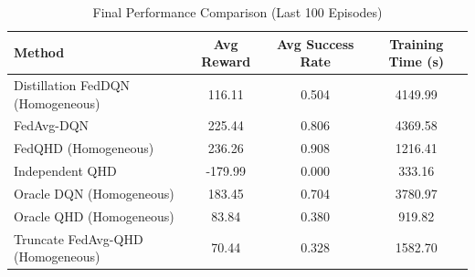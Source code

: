 \begin{table}[t]
\centering
\caption{Final Performance Comparison (Last 100 Episodes)}
\label{tab:performance_summary}
\begin{tabular}{lccc}
\toprule
Method & Avg Reward & Avg Success Rate & Training Time (s) \\
\midrule
Distillation FedDQN (Homogeneous) & 116.11 & 0.504 & 4149.99 \\
FedAvg-DQN & 225.44 & 0.806 & 4369.58 \\
FedQHD (Homogeneous) & 236.26 & 0.908 & 1216.41 \\
Independent QHD & -179.99 & 0.000 & 333.16 \\
Oracle DQN (Homogeneous) & 183.45 & 0.704 & 3780.97 \\
Oracle QHD (Homogeneous) & 83.84 & 0.380 & 919.82 \\
Truncate FedAvg-QHD (Homogeneous) & 70.44 & 0.328 & 1582.70 \\
\bottomrule
\end{tabular}
\end{table}